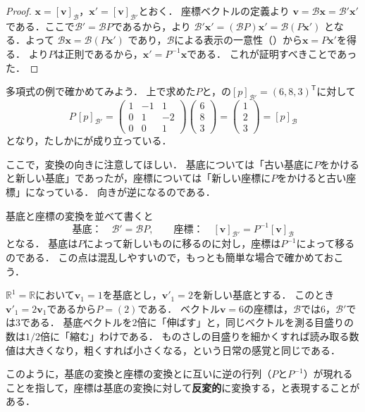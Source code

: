 \begin{tleftbar}
\begin{proof}
  $\bm{x} = [\bm{v}]_{\mathcal{B}}$，$\bm{x}' = [\bm{v}]_{\mathcal{B}'}$とおく．
  座標ベクトルの定義より
  $\bm{v} = \mathcal{B}\bm{x} = \mathcal{B}'\bm{x}'$
  である．ここで$\mathcal{B}' = \mathcal{B}P$であるから，より
  $\mathcal{B}'\bm{x}' = (\mathcal{B}P)\bm{x}' = \mathcal{B}(P\bm{x}')$
  となる．よって
  $\mathcal{B}\bm{x} = \mathcal{B}(P\bm{x}')$
  であり，$\mathcal{B}$による表示の一意性（）から$\bm{x} = P\bm{x}'$を得る．
  より$P$は正則であるから，$\bm{x}' = P^{-1}\bm{x}$である．
  これが証明すべきことであった．
\end{proof}
\end{tleftbar}

多項式の例で確かめてみよう．
上で求めた$P$と，の$[p]_{\mathcal{B}'}=(6,8,3)^\mathsf{T}$に対して
\[
  P\,[p]_{\mathcal{B}'}
  =\begin{pmatrix} 1 & -1 & 1 \\ 0 & 1 & -2 \\ 0 & 0 & 1 \end{pmatrix}
  \begin{pmatrix} 6 \\ 8 \\ 3 \end{pmatrix}
  =\begin{pmatrix} 1 \\ 2 \\ 3 \end{pmatrix}
  =[p]_{\mathcal{B}}
\]
となり，たしかにが成り立っている．

ここで，変換の向きに注意してほしい．
基底については「古い基底に$P$をかけると新しい基底」であったが，座標については「新しい座標に$P$をかけると古い座標」になっている．
向きが逆になるのである．

\begin{remark}[基底と座標の変換の向き]
  基底と座標の変換を並べて書くと
  \[
    \text{基底：} \quad \mathcal{B}' = \mathcal{B}P,
    \qquad
    \text{座標：} \quad [\bm{v}]_{\mathcal{B}'} = P^{-1} [\bm{v}]_{\mathcal{B}}
  \]
  となる．
  基底は$P$によって新しいものに移るのに対し，座標は$P^{-1}$によって移るのである．
  この点は混乱しやすいので，もっとも簡単な場合で確かめておこう．

  $\mathbb{R}^1=\mathbb{R}$において$\bm{v}_1 = 1$を基底とし，$\bm{v}'_1 = 2$を新しい基底とする．
  このとき$\bm{v}'_1 = 2\bm{v}_1$であるから$P = (2)$である．
  ベクトル$\bm{v} = 6$の座標は，$\mathcal{B}$では$6$，$\mathcal{B}'$では$3$である．
  基底ベクトルを$2$倍に「伸ばす」と，同じベクトルを測る目盛りの数は$1/2$倍に「縮む」わけである．
  ものさしの目盛りを細かくすれば読み取る数値は大きくなり，粗くすれば小さくなる，という日常の感覚と同じである．

  このように，基底の変換と座標の変換とに互いに逆の行列（$P$と$P^{-1}$）が現れることを指して，座標は基底の変換に対して\textbf{反変的}に変換する，と表現することがある．
\end{remark}

